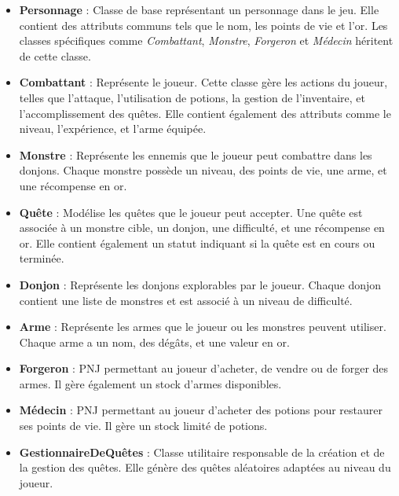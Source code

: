 \documentclass{article}
\begin{document}
\begin{itemize}
    \item \textbf{Personnage} : Classe de base représentant un personnage dans le jeu. Elle contient des attributs communs tels que le nom, les points de vie et l'or. Les classes spécifiques comme \textit{Combattant}, \textit{Monstre}, \textit{Forgeron} et \textit{Médecin} héritent de cette classe.
    
    \item \textbf{Combattant} : Représente le joueur. Cette classe gère les actions du joueur, telles que l'attaque, l'utilisation de potions, la gestion de l'inventaire, et l'accomplissement des quêtes. Elle contient également des attributs comme le niveau, l'expérience, et l'arme équipée.
    
    \item \textbf{Monstre} : Représente les ennemis que le joueur peut combattre dans les donjons. Chaque monstre possède un niveau, des points de vie, une arme, et une récompense en or.
    
    \item \textbf{Quête} : Modélise les quêtes que le joueur peut accepter. Une quête est associée à un monstre cible, un donjon, une difficulté, et une récompense en or. Elle contient également un statut indiquant si la quête est en cours ou terminée.
    
    \item \textbf{Donjon} : Représente les donjons explorables par le joueur. Chaque donjon contient une liste de monstres et est associé à un niveau de difficulté.
    
    \item \textbf{Arme} : Représente les armes que le joueur ou les monstres peuvent utiliser. Chaque arme a un nom, des dégâts, et une valeur en or.
    
    \item \textbf{Forgeron} : PNJ permettant au joueur d'acheter, de vendre ou de forger des armes. Il gère également un stock d'armes disponibles.
    
    \item \textbf{Médecin} : PNJ permettant au joueur d'acheter des potions pour restaurer ses points de vie. Il gère un stock limité de potions.
    
    \item \textbf{GestionnaireDeQuêtes} : Classe utilitaire responsable de la création et de la gestion des quêtes. Elle génère des quêtes aléatoires adaptées au niveau du joueur.
\end{itemize}
\end{document}
